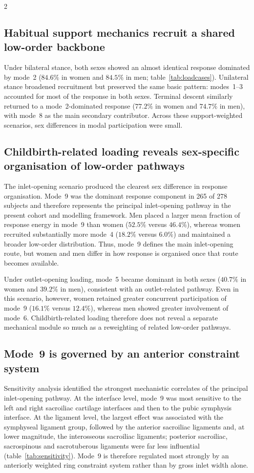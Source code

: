 \documentclass[openacc]{rsproca_new}
\begin{document}
\begin{multicols}{2}
\subsection{Habitual support mechanics recruit a shared low-order backbone}

Under bilateral stance, both sexes showed an almost identical response dominated by mode~2 ($84.6\%$ in women and $84.5\%$ in men; table~\ref{tab:loadcases}). Unilateral stance broadened recruitment but preserved the same basic pattern: modes~1--3 accounted for most of the response in both sexes. Terminal descent similarly returned to a mode~2-dominated response ($77.2\%$ in women and $74.7\%$ in men), with mode~8 as the main secondary contributor. Across these support-weighted scenarios, sex differences in modal participation were small.

\subsection{Childbirth-related loading reveals sex-specific organisation of low-order pathways}

The inlet-opening scenario produced the clearest sex difference in response organisation. Mode~9 was the dominant response component in 265 of 278 subjects and therefore represents the principal inlet-opening pathway in the present cohort and modelling framework. Men placed a larger mean fraction of response energy in mode~9 than women ($52.5\%$ versus $46.4\%$), whereas women recruited substantially more mode~4 ($18.2\%$ versus $6.0\%$) and maintained a broader low-order distribution. Thus, mode~9 defines the main inlet-opening route, but women and men differ in how response is organised once that route becomes available.

Under outlet-opening loading, mode~5 became dominant in both sexes ($40.7\%$ in women and $39.2\%$ in men), consistent with an outlet-related pathway. Even in this scenario, however, women retained greater concurrent participation of mode~9 ($16.1\%$ versus $12.4\%$), whereas men showed greater involvement of mode~6. Childbirth-related loading therefore does not reveal a separate mechanical module so much as a reweighting of related low-order pathways.

\subsection{Mode~9 is governed by an anterior constraint system}

Sensitivity analysis identified the strongest mechanistic correlates of the principal inlet-opening pathway. At the interface level, mode~9 was most sensitive to the left and right sacroiliac cartilage interfaces and then to the pubic symphysis interface. At the ligament level, the largest effect was associated with the symphyseal ligament group, followed by the anterior sacroiliac ligaments and, at lower magnitude, the interosseous sacroiliac ligaments; posterior sacroiliac, sacrospinous and sacrotuberous ligaments were far less influential (table~\ref{tab:sensitivity}). Mode~9 is therefore regulated most strongly by an anteriorly weighted ring constraint system rather than by gross inlet width alone.


\end{multicols}
\end{document}
